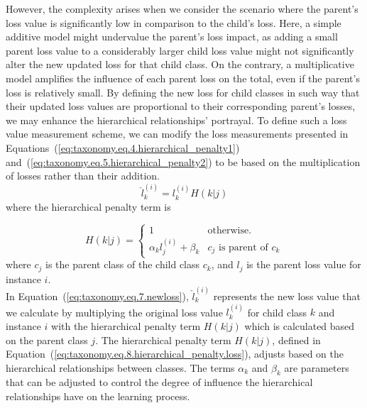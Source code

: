 \documentclass[review,1p,times,numbers]{elsarticle}
\begin{document}
However, the complexity arises when we consider the scenario where the parent's loss value is significantly low in comparison to the child's loss. Here, a simple additive model might undervalue the parent's loss impact, as adding a small parent loss value to a considerably larger child loss value might not significantly alter the new updated loss for that child class. On the contrary, a multiplicative model amplifies the influence of each parent loss on the total, even if the parent's loss is relatively small. By defining the new loss for child classes in such way that their updated loss values are proportional to their corresponding parent's losses, we may enhance the hierarchical relationships' portrayal. To define such a loss value measurement scheme, we can modify the loss measurements presented in Equations~(\ref{eq:taxonomy.eq.4.hierarchical_penalty1}) and~(\ref{eq:taxonomy.eq.5.hierarchical_penalty2}) to be based on the multiplication of losses rather than their addition.
\begin{equation}
    \label{eq:taxonomy.eq.7.newloss}
    \widehat{l}_k^{(i)} = l_k^{(i)} H( k \vert j)
\end{equation}
where the hierarchical penalty term is

\begin{equation}
    \label{eq:taxonomy.eq.8.hierarchical_penalty.loss}
    H(k \vert j) =
    \left\{ \begin{array}{ll}
    1 & \text{otherwise.}
    \\
    \alpha_k l_j^{(i)} + \beta_k & c_j \text{ is parent of } c_k
    \end{array} \right.
\end{equation}
where $c_j$ is the parent class of the child class $c_k$, and $l_j$ is the parent loss value for instance $i$. \\

In Equation~(\ref{eq:taxonomy.eq.7.newloss}), $\widehat{l}_k^{(i)}$ represents the new loss value that we calculate by multiplying the original loss value $l_k^{(i)}$ for child class $k$ and instance $i$ with the hierarchical penalty term $H(k \vert j)$ which is calculated based on the parent class $j$. The hierarchical penalty term $H(k \vert j)$, defined in Equation~(\ref{eq:taxonomy.eq.8.hierarchical_penalty.loss}), adjusts based on the hierarchical relationships between classes. The terms $\alpha _k$ and $\beta_k$ are parameters that can be adjusted to control the degree of influence the hierarchical relationships have on the learning process.
\end{document}
